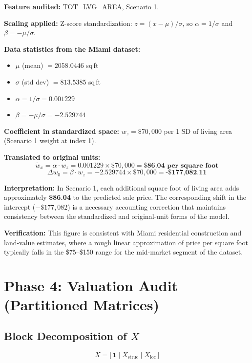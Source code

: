 \documentclass[11pt]{article}
\begin{document}
\textbf{Feature audited:} TOT\_LVG\_AREA, Scenario 1.

\textbf{Scaling applied:} Z-score standardization: $z = (x - \mu)/\sigma$, so $\alpha = 1/\sigma$ and $\beta = -\mu/\sigma$.

\textbf{Data statistics from the Miami dataset:}
\begin{itemize}
    \item $\mu$ (mean) $= 2058.0446$ sq\,ft
    \item $\sigma$ (std dev) $= 813.5385$ sq\,ft
    \item $\alpha = 1/\sigma = 0.001229$
    \item $\beta = -\mu/\sigma = -2.529744$
\end{itemize}

\textbf{Coefficient in standardized space:} $w_z = \$70{,}000$ per 1 SD of living area (Scenario 1 weight at index 1).

\textbf{Translated to original units:}
\[
\tilde{w}_x = \alpha \cdot w_z = 0.001229 \times \$70{,}000 = \textbf{\$86.04 per square foot}
\]
\[
\Delta w_0 = \beta \cdot w_z = -2.529744 \times \$70{,}000 = \textbf{-\$177{,}082.11}
\]

\textbf{Interpretation:} In Scenario 1, each additional square foot of living area adds approximately \textbf{\$86.04} to the predicted sale price. The corresponding shift in the intercept ($-\$177{,}082$) is a necessary accounting correction that maintains consistency between the standardized and original-unit forms of the model.

\textbf{Verification:} This figure is consistent with Miami residential construction and land-value estimates, where a rough linear approximation of price per square foot typically falls in the \$75--\$150 range for the mid-market segment of the dataset.

\section{Phase 4: Valuation Audit (Partitioned Matrices)}

\subsection*{Block Decomposition of $X$}

\[
X = \bigl[\,\mathbf{1} \;\big|\; X_{\text{struc}} \;\big|\; X_{\text{loc}}\,\bigr]
\]
\end{document}
